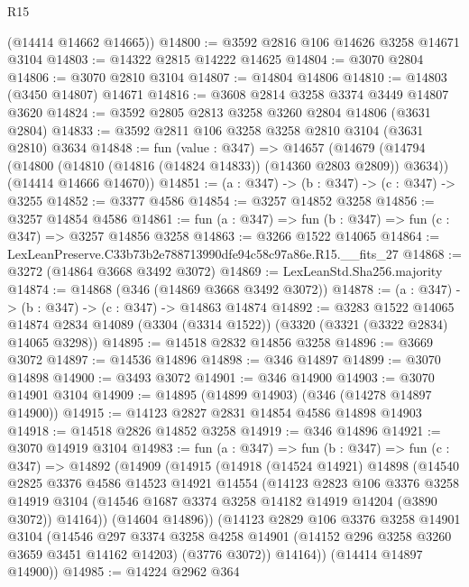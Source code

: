 \begin{lexlean}{R15}
\begin{coremodule}
      (@14414 @14662 @14665))
@14800 := @3592 @2816 @106 @14626 @3258 @14671 @3104
@14803 := @14322 @2815 @14222 @14625
@14804 := @3070 @2804
@14806 := @3070 @2810 @3104
@14807 := @14804 @14806
@14810 := @14803 (@3450 @14807) @14671
@14816 := @3608 @2814 @3258 @3374 @3449 @14807 @3620
@14824 := @3592 @2805 @2813 @3258 @3260 @2804 @14806 (@3631 @2804)
@14833 := @3592 @2811 @106 @3258 @3258 @2810 @3104 (@3631 @2810) @3634
@14848 := fun (value : @347) =>
  @14657
    (@14679
      (@14794 (@14800 (@14810 (@14816 (@14824 @14833)) (@14360 @2803 @2809)) @3634))
      (@14414 @14666 @14670))
@14851 := (a : @347) -> (b : @347) -> (c : @347) -> @3255
@14852 := @3377 @4586
@14854 := @3257 @14852 @3258
@14856 := @3257 @14854 @4586
@14861 := fun (a : @347) => fun (b : @347) => fun (c : @347) => @3257 @14856 @3258
@14863 := @3266 @1522 @14065
@14864 := LexLeanPreserve.C33b73b2e788713990dfe94c58c97a86e.R15.__fits_27
@14868 := @3272 (@14864 @3668 @3492 @3072)
@14869 := LexLeanStd.Sha256.majority
@14874 := @14868 (@346 (@14869 @3668 @3492 @3072))
@14878 := (a : @347) -> (b : @347) -> (c : @347) -> @14863 @14874
@14892 := @3283
    @1522
    @14065
    @14874
    @2834
    @14089
    (@3304 (@3314 @1522))
    (@3320 (@3321 (@3322 @2834) @14065 @3298))
@14895 := @14518 @2832 @14856 @3258
@14896 := @3669 @3072
@14897 := @14536 @14896
@14898 := @346 @14897
@14899 := @3070 @14898
@14900 := @3493 @3072
@14901 := @346 @14900
@14903 := @3070 @14901 @3104
@14909 := @14895 (@14899 @14903) (@346 (@14278 @14897 @14900))
@14915 := @14123 @2827 @2831 @14854 @4586 @14898 @14903
@14918 := @14518 @2826 @14852 @3258
@14919 := @346 @14896
@14921 := @3070 @14919 @3104
@14983 := fun (a : @347) =>
  fun (b : @347) =>
  fun (c : @347) =>
  @14892
    (@14909
      (@14915
        (@14918
          (@14524 @14921)
          @14898
          (@14540
            @2825
            @3376
            @4586
            @14523
            @14921
            @14554
            (@14123
              @2823
              @106
              @3376
              @3258
              @14919
              @3104
              (@14546 @1687 @3374 @3258 @14182 @14919 @14204 (@3890 @3072))
              @14164))
          (@14604 @14896))
        (@14123
          @2829
          @106
          @3376
          @3258
          @14901
          @3104
          (@14546
            @297
            @3374
            @3258
            @4258
            @14901
            (@14152 @296 @3258 @3260 @3659 @3451 @14162 @14203)
            (@3776 @3072))
          @14164))
      (@14414 @14897 @14900))
@14985 := @14224 @2962 @364

\end{coremodule}
\end{lexlean}
